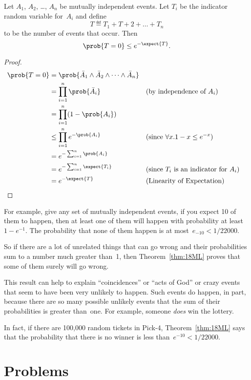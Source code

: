 \begin{theorem}\label{thm:18ML}
Let $A_1$, $A_2$, \dots, $A_n$ be mutually independent events.  Let
$T_i$ be the indicator random variable for~$A_i$ and define
\begin{equation*}
    T \eqdef T_1 + T+2 + \dots + T_n
\end{equation*}
to be the number of events that occur.  Then
\begin{equation*}
    \prob{T = 0} \le e^{- \expect{T}}.
\end{equation*}
\end{theorem}

\begin{proof}
\begin{align*}
\prob{T = 0}
    &= \prob{ \bar{A}_1 \land \bar{A}_2 \land \dots \land \bar{A}_n } \\
    &= \prod_{i = 1}^n \prob{\bar{A}_i}
        && \text{(by independence of $A_i$)} \\
    &= \prod_{i = 1}^n (1 - \prob{A_i}) \\
    &\le \prod_{i = 1}^n e^{-\prob{A_i}}
        && \text{(since $\forall x. 1 - x \le e^{-x}$)} \\
    &= e^{-\sum_{i = 1}^n \prob{A_i}} \\
    &= e^{-\sum_{i = 1}^n \expect{T_i}} 
        && \text{(since $T_i$ is an indicator for $A_i$)} \\
    &= e^{-\expect{T}}
        && \text{(Linearity of Expectation)}
        & \qedhere
\end{align*}
\end{proof}

For example, give any set of mutually independent events, if you
expect 10 of them to happen, then at least one of them will happen
with probability at least~$1 - e^{-1}$.  The probability that none of
them happen is at most~$e_{-10} < 1/22000$.

So if there are a lot of unrelated things that can go wrong and their
probabilities sum to a number much greater than~1, then
Theorem~\ref{thm:18ML} proves that some of them surely will go wrong.

This result can help to explain ``coincidences'' or ``acts of God'' or
crazy events that seem to have been very unlikely to happen.  Such
events do happen, in part, because there are so many possible unlikely
events that the sum of their probabilities is greater than~one.  For
example, someone \emph{does} win the lottery.

In fact, if there are 100,000 random tickets in Pick-4,
Theorem~\ref{thm:18ML} says that the probability that there is no
winner is less than~$e^{-10} < 1/22000$.

\section{Problems}

\endinput


